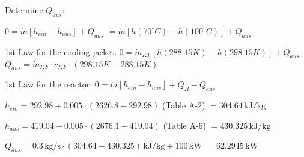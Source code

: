 Determine \( \dot{Q}_{aus} \):  

\( 0 = \dot{m} \left[ h_{ein} - h_{aus} \right] + \dot{Q}_{aus} \)  
\( = \dot{m} \left[ h(70^\circ C) - h(100^\circ C) \right] + \dot{Q}_{aus} \)  

1st Law for the cooling jacket:  
\( 0 = \dot{m}_{KF} \left[ h(288.15K) - h(298.15K) \right] + \dot{Q}_{aus} \)  
\( \dot{Q}_{aus} = \dot{m}_{KF} \cdot c_{KF} \cdot \left( 298.15K - 288.15K \right) \)  

1st Law for the reactor:  
\( 0 = \dot{m} \left[ h_{ein} - h_{aus} \right] + \dot{Q}_{R} - \dot{Q}_{aus} \)  

\( h_{ein} = 292.98 + 0.005 \cdot (2626.8 - 292.98) \) (Table A-2)  
\( = 304.64 \, \text{kJ/kg} \)  

\( h_{aus} = 419.04 + 0.005 \cdot (2676.1 - 419.04) \) (Table A-6)  
\( = 430.325 \, \text{kJ/kg} \)  

\( \dot{Q}_{aus} = 0.3 \, \text{kg/s} \cdot \left( 304.64 - 430.325 \right) \, \text{kJ/kg} + 100 \, \text{kW} \)  
\( = 62.2945 \, \text{kW} \)